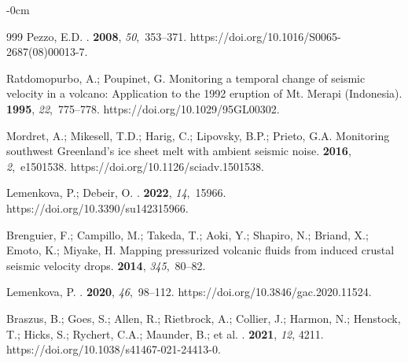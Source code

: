 \documentclass[sensors,article,accept,moreauthors,pdftex]{Definitions/mdpi}
\begin{document}
\begin{adjustwidth}{-\extralength}{0cm}
\begin{thebibliography}{999}
Pezzo, E.D.
.
 {\bf 2008}, {\em 50},~353--371.
\newblock
{https://doi.org/10.1016/S0065-2687(08)00013-7}.

Ratdomopurbo, A.; Poupinet, G.
\newblock Monitoring a temporal change of seismic velocity in a volcano:
  Application to the 1992 eruption of Mt. Merapi (Indonesia).
 {\bf 1995}, {\em 22},~775--778.
\newblock
{https://doi.org/10.1029/95GL00302}.

Mordret, A.; Mikesell, T.D.; Harig, C.; Lipovsky, B.P.; Prieto, G.A.
\newblock Monitoring southwest Greenland's %
ice sheet melt with ambient
  seismic noise.
 {\bf 2016}, {\em 2},~e1501538.
\newblock
{https://doi.org/10.1126/sciadv.1501538}.

Lemenkova, P.; Debeir, O.
.
 {\bf 2022}, {\em 14},~15966.
\newblock
{https://doi.org/10.3390/su142315966}.

Brenguier, F.; Campillo, M.; Takeda, T.; Aoki, Y.; Shapiro, N.; Briand, X.;
  Emoto, K.; Miyake, H.
\newblock Mapping pressurized volcanic fluids from induced crustal seismic
  velocity drops.
 {\bf 2014}, {\em 345},~80--82.

Lemenkova, P.
.
 {\bf 2020}, {\em 46},~98--112.
\newblock
 {https://doi.org/10.3846/gac.2020.11524}.

Braszus, B.; Goes, S.; Allen, R.; Rietbrock, A.; Collier, J.; Harmon, N.;
  Henstock, T.; Hicks, S.; Rychert, C.A.; Maunder, B.; et al.
.
 {\bf 2021}, {\em 12}, 4211. %
\newblock
{https://doi.org/10.1038/s41467-021-24413-0}.


\end{thebibliography}
\end{adjustwidth}
\end{document}
